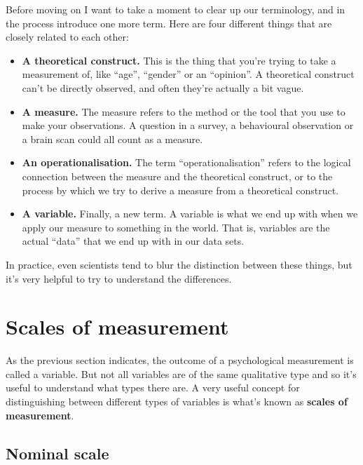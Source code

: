 \documentclass[
  letterpaper,
]{book}
\providecommand{\tightlist}{%
  \setlength{\itemsep}{0pt}\setlength{\parskip}{0pt}}\usepackage{longtable,booktabs,array}
\begin{document}
Before moving on I want to take a moment to clear up our terminology,
and in the process introduce one more term. Here are four different
things that are closely related to each other:

\begin{itemize}
\tightlist
\item
  \textbf{A theoretical construct.} This is the thing that you're trying
  to take a measurement of, like ``age'', ``gender'' or an ``opinion''.
  A theoretical construct can't be directly observed, and often they're
  actually a bit vague.
\item
  \textbf{A measure.} The measure refers to the method or the tool that
  you use to make your observations. A question in a survey, a
  behavioural observation or a brain scan could all count as a measure.
\item
  \textbf{An operationalisation.} The term ``operationalisation'' refers
  to the logical connection between the measure and the theoretical
  construct, or to the process by which we try to derive a measure from
  a theoretical construct.
\item
  \textbf{A variable.} Finally, a new term. A variable is what we end up
  with when we apply our measure to something in the world. That is,
  variables are the actual ``data'' that we end up with in our data
  sets.
\end{itemize}

In practice, even scientists tend to blur the distinction between these
things, but it's very helpful to try to understand the differences.

\hypertarget{sec-Scales-of-measurement}{%
\section{Scales of measurement}\label{sec-Scales-of-measurement}}

As the previous section indicates, the outcome of a psychological
measurement is called a variable. But not all variables are of the same
qualitative type and so it's useful to understand what types there are.
A very useful concept for distinguishing between different types of
variables is what's known as \textbf{scales of measurement}.

\hypertarget{nominal-scale}{%
\subsection{Nominal scale}\label{nominal-scale}}
\end{document}
